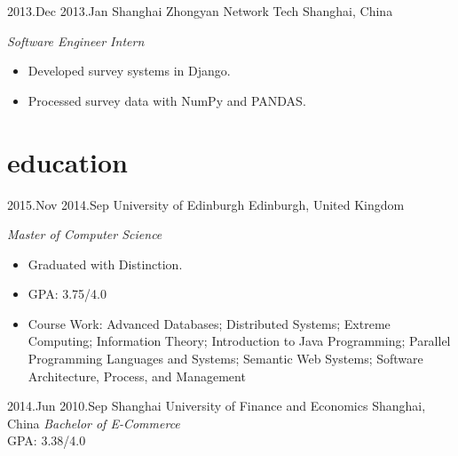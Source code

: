 \documentclass[]{friggeri-cv} %
\begin{document}
\begin{entrylist}
	\entry
	{2013.Dec}
	{2013.Jan}
	{Shanghai Zhongyan Network Tech}
	{Shanghai, China}
	{\emph{Software Engineer Intern}
		\begin{itemize}
			\item Developed survey systems in Django.
			\item Processed survey data with NumPy and PANDAS.
		\end{itemize}
	}
\end{entrylist}


\section{education}

\begin{entrylist}
\entry
{2015.Nov}
{2014.Sep}
{University of Edinburgh}
{Edinburgh, United Kingdom}
{
	\emph{Master of Computer Science}
	\begin{itemize}
		\item Graduated with Distinction.
		\item GPA: 3.75/4.0
		\item Course Work: Advanced Databases; Distributed Systems; Extreme Computing; Information Theory; Introduction to Java Programming; Parallel Programming Languages and Systems; Semantic Web Systems; Software Architecture, Process, and Management
	\end{itemize}
}

\entry
{2014.Jun}
{2010.Sep}
{Shanghai University of Finance and Economics}
{Shanghai, China}
{
	\emph{Bachelor of E-Commerce}\\
	GPA: 3.38/4.0
}
\end{entrylist}
\end{document}
